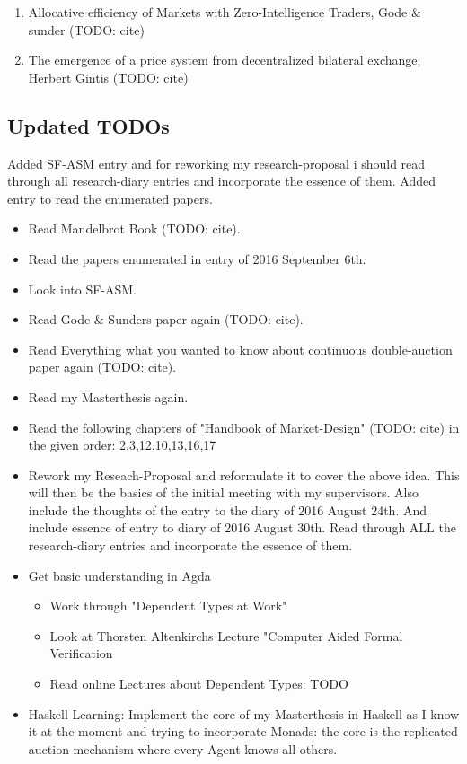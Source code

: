 \begin{enumerate}
\item Allocative efficiency of Markets with Zero-Intelligence Traders, Gode  \& sunder (TODO: cite)
\item The emergence of a price system from decentralized bilateral exchange, Herbert Gintis (TODO: cite)
\end{enumerate}


\subsection*{Updated TODOs}
Added SF-ASM entry and for reworking my research-proposal i should read through all research-diary entries and incorporate the essence of them. Added entry to read the enumerated papers.

\begin{itemize}
\item Read Mandelbrot Book (TODO: cite).
\item Read the papers enumerated in entry of 2016 September 6th.
\item Look into SF-ASM.
\item Read Gode \& Sunders paper again (TODO: cite).
\item Read Everything what you wanted to know about continuous double-auction paper again (TODO: cite).
\item Read my Masterthesis again.
\item Read the following chapters of "Handbook of Market-Design" (TODO: cite) in the given order: 2,3,12,10,13,16,17
\item Rework my Reseach-Proposal and reformulate it to cover the above idea. 
This will then be the basics of the initial meeting with my supervisors. Also include the thoughts of the entry to the diary of 2016 August 24th. And include essence of entry to diary of 2016 August 30th. Read through ALL the research-diary entries and incorporate the essence of them.
\item Get basic understanding in Agda 
	\begin{itemize}
	\item Work through "Dependent Types at Work"
	\item Look at Thorsten Altenkirchs Lecture "Computer Aided Formal Verification
	\item Read online Lectures about Dependent Types: TODO
	\end{itemize}
\item Haskell Learning: Implement the core of my Masterthesis in Haskell as I know it at the moment and trying to incorporate Monads: the core is the replicated auction-mechanism where every Agent knows all others.
\end{itemize}

